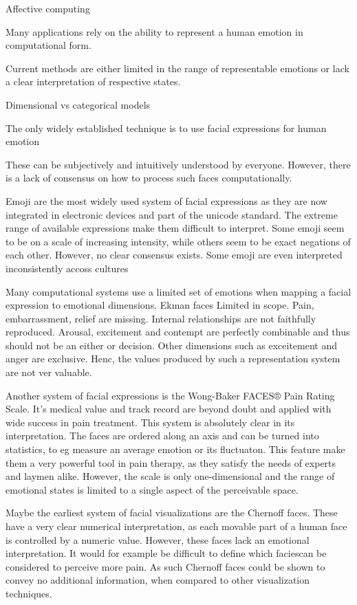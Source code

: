 \documentclass[utf8]{frontiersSCNS} %
\begin{document}
Affective computing

Many applications rely on the ability to represent a human emotion in computational form.

Current methods are either limited in the range of representable emotions or lack a clear interpretation of respective states.

Dimensional vs categorical models

The only widely established technique is to use facial expressions for human emotion

These can be subjectively and intuitively understood by everyone.
However, there is a lack of consensus on how to process such faces computationally.


Emoji are the most widely used system of facial expressions as they are now integrated in electronic devices and part of the unicode standard.
The extreme range of available expressions make them difficult to interpret.
Some emoji seem to be on a scale of increasing intensity, while others seem to be exact negations of each other. However, no clear consensus exists. Some emoji are even interpreted inconsistently accoss cultures

Many computational systems use a limited set of emotions when mapping a facial expression to emotional dimensions.
Ekman faces
Limited in scope. Pain, embarrassment, relief are missing.
Internal relationships are not faithfully reproduced.
Arousal, excitement and contempt are perfectly combinable and thus should not be an either or decision.
Other dimensions such as exceitement and anger are exclusive.
Henc, the values produced by such a representation system are not ver valuable.


Another system of facial expressions is the Wong-Baker FACES® Pain Rating Scale.
It's medical value and track record are beyond doubt and applied with wide success in pain treatment.
This system is absolutely clear in its interpretation.
The faces are ordered along an axis and can be turned into statistics, to eg measure an average emotion or its fluctuaton.
This feature make them a very powerful tool in pain therapy, as they satisfy the needs of experts and laymen alike.
However, the scale is only one-dimensional and the range of emotional states is limited to a single aspect of the perceivable space.


Maybe the earliest system of facial visualizations are the Chernoff faces.
These have a very clear numerical interpretation, as each movable part of a human face is controlled by a numeric value.
However, these faces lack an emotional interpretation. It would for example be difficult to define which faciescan be considered to perceive more pain. As such Chernoff faces could be shown to convey no additional information, when compared to other visualization techniques.
\cite{chernoff}
\end{document}
